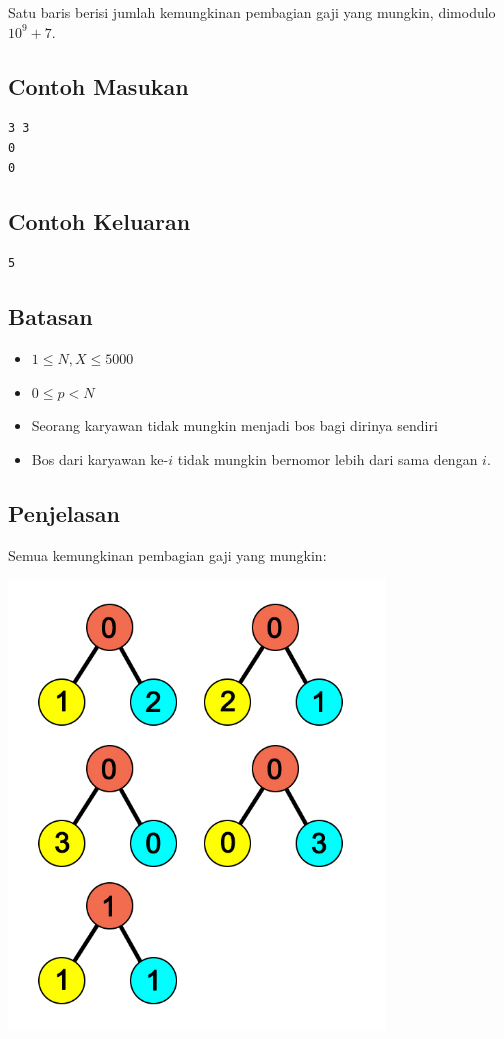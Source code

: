 \documentclass{article}
\begin{document}
\par\noindent Satu baris berisi jumlah kemungkinan pembagian gaji yang mungkin, dimodulo $10^9+7$.

\subsection*{Contoh Masukan}

\begin{lstlisting}
3 3
0
0
\end{lstlisting}

\subsection*{Contoh Keluaran}

\begin{lstlisting}
5
\end{lstlisting}

\subsection*{Batasan}

\begin{itemize}
  \item $1 \leq N, X \leq 5000$
  \item $0 \leq p < N$
  \item Seorang karyawan tidak mungkin menjadi bos bagi dirinya sendiri
  \item Bos dari karyawan ke-$i$ tidak mungkin bernomor lebih dari sama dengan $i$.
\end{itemize}

\subsection*{Penjelasan}

\par\noindent Semua kemungkinan pembagian gaji yang mungkin:

\includegraphics[width=10cm]{sample-1}
\end{document}
